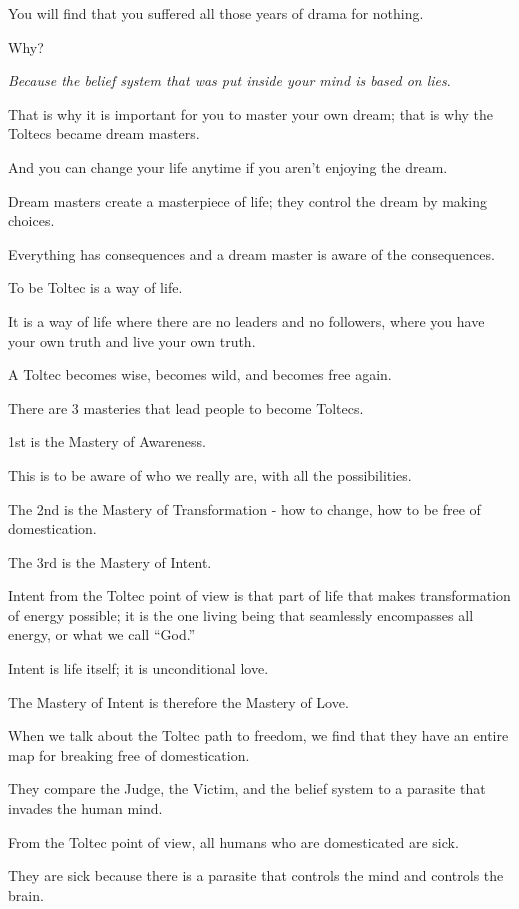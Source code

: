 \documentclass{article}
\numberwithin{equation}{section}
\begin{document}
You will find that you suffered all those years of drama for nothing.

Why?

\textit{Because the belief system that was put inside your mind is based on lies}.

%
That is why it is important for you to master your own dream; that is why the Toltecs became dream masters.


And you can change your life anytime if you aren't enjoying the dream.

Dream masters create a masterpiece of life; they control the dream by making choices.

Everything has consequences and a dream master is aware of the consequences.

%
To be Toltec is a way of life.

It is a way of life where there are no leaders and no followers, where you have your own truth and live your own truth.

A Toltec becomes wise, becomes wild, and becomes free again.

%
There are 3 masteries that lead people to become Toltecs.

1st is the Mastery of Awareness.

This is to be aware of who we really are, with all the possibilities.

The 2nd is the Mastery of Transformation - how to change, how to be free of domestication.

The 3rd is the Mastery of Intent.

Intent from the Toltec point of view is that part of life that makes transformation of energy possible; it is the one living being that seamlessly encompasses all energy, or what we call ``God.''

Intent is life itself; it is unconditional love.

The Mastery of Intent is therefore the Mastery of Love.

%
When we talk about the Toltec path to freedom, we find that they have an entire map for breaking free of domestication.

They compare the Judge, the Victim, and the belief system to a parasite that invades the human mind.

From the Toltec point of view, all humans who are domesticated are sick.

They are sick because there is a parasite that controls the mind and controls the brain.
\end{document}

